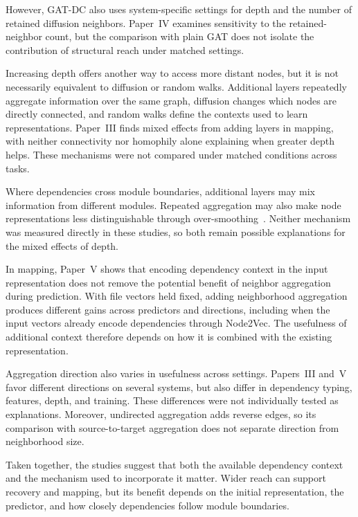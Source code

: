 However, GAT-DC also uses system-specific settings for depth and the number of retained diffusion neighbors. Paper~IV examines sensitivity to the retained-neighbor count, but the comparison with plain GAT does not isolate the contribution of structural reach under matched settings.

Increasing depth offers another way to access more distant nodes, but it is not necessarily equivalent to diffusion or random walks. Additional layers repeatedly aggregate information over the same graph, diffusion changes which nodes are directly connected, and random walks define the contexts used to learn representations. Paper~III finds mixed effects from adding layers in mapping, with neither connectivity nor homophily alone explaining when greater depth helps. These mechanisms were not compared under matched conditions across tasks.

Where dependencies cross module boundaries, additional layers may mix information from different modules. Repeated aggregation may also make node representations less distinguishable through over-smoothing~\cite{gnn_oversmoothing}. Neither mechanism was measured directly in these studies, so both remain possible explanations for the mixed effects of depth.

In mapping, Paper~V shows that encoding dependency context in the input representation does not remove the potential benefit of neighbor aggregation during prediction. With file vectors held fixed, adding neighborhood aggregation produces different gains across predictors and directions, including when the input vectors already encode dependencies through Node2Vec. The usefulness of additional context therefore depends on how it is combined with the existing representation.

Aggregation direction also varies in usefulness across settings. Papers~III and~V favor different directions on several systems, but also differ in dependency typing, features, depth, and training. These differences were not individually tested as explanations. Moreover, undirected aggregation adds reverse edges, so its comparison with source-to-target aggregation does not separate direction from neighborhood size.

Taken together, the studies suggest that both the available dependency context and the mechanism used to incorporate it matter. Wider reach can support recovery and mapping, but its benefit depends on the initial representation, the predictor, and how closely dependencies follow module boundaries.

